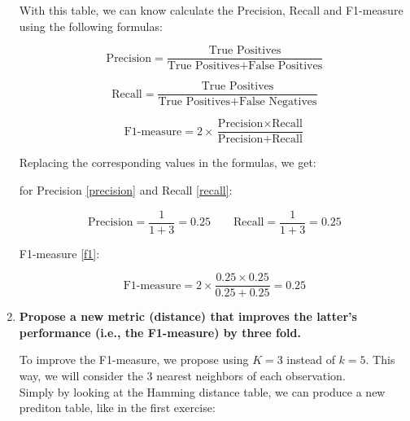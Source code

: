 \documentclass[12pt]{article}
\begin{document}
\begin{enumerate}[leftmargin=\labelsep]
    With this table, we can know calculate the Precision, Recall and F1-measure using the following formulas:

    \begin{equation}\label{precision}
        \text{Precision} = \frac{\text{True Positives}}{{\text{True Positives} +
        \text{False Positives}}}
    \end{equation}

    \begin{equation}\label{recall}
        \text{Recall} = \frac{\text{True Positives}}{{\text{True Positives} + \text{False Negatives}}}
    \end{equation}

    \begin{equation}\label{f1}
        \text{F1-measure} = 2 \times \frac{{\text{Precision} \times \text{Recall}}}{{\text{Precision} + \text{Recall}}}
    \end{equation}

    \vspace{10pt}
    Replacing the corresponding values in the formulas, we get:

    \vspace{10pt}
    for Precision \eqref{precision} and Recall \eqref{recall}:

    \begin{equation*}
        \text{Precision} = \frac{1}{1 + 3} = 0.25 \quad \quad
        \text{Recall} = \frac{1}{1 + 3} = 0.25
    \end{equation*}

    F1-measure \eqref{f1}:

    \begin{equation*}
        \text{F1-measure} = 2 \times \frac{0.25 \times 0.25}{0.25 + 0.25} = 0.25
    \end{equation*}

    \newpage
    \item \textbf{Propose a new metric (distance) that improves the latter's performance (i.e., the
    F1-measure) by three fold.} 
    
    \vspace{10pt}
    
    To improve the F1-measure, we propose using $K=3$ instead of $k=5$. This way, we will consider the 3 nearest neighbors of each observation.\\
    Simply by looking at the Hamming distance table, we can produce a new prediton table, like in the first exercise:


\end{enumerate}
\end{document}
